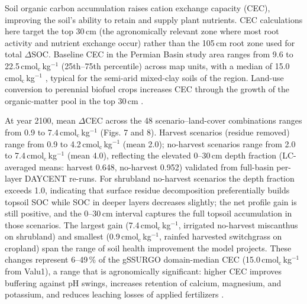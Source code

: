 \documentclass[11pt]{article}
\begin{document}
Soil organic carbon accumulation raises cation exchange capacity (CEC), improving the soil's ability to retain and supply plant nutrients. CEC calculations here target the top 30\,cm (the agronomically relevant zone where most root activity and nutrient exchange occur) rather than the 105\,cm root zone used for total $\Delta$SOC. Baseline CEC in the Permian Basin study area ranges from 9.6 to 22.5\,cmol$_\text{c}$\,kg$^{-1}$ (25th--75th percentile) across map units, with a median of 15.0\,cmol$_\text{c}$\,kg$^{-1}$ \citep{NRCSgSSURGOPlaceholder}, typical for the semi-arid mixed-clay soils of the region. Land-use conversion to perennial biofuel crops increases CEC through the growth of the organic-matter pool in the top 30\,cm \citep{BradyWeilSoilsPlaceholder}.

At year 2100, mean $\Delta$CEC across the 48 scenario--land-cover combinations ranges from 0.9 to 7.4\,cmol$_\text{c}$\,kg$^{-1}$ (Figs. 7 and 8). Harvest scenarios (residue removed) range from 0.9 to 4.2\,cmol$_\text{c}$\,kg$^{-1}$ (mean 2.0); no-harvest scenarios range from 2.0 to 7.4\,cmol$_\text{c}$\,kg$^{-1}$ (mean 4.0), reflecting the elevated 0--30\,cm depth fraction (LC-averaged means: harvest 0.648, no-harvest 0.952) validated from full-basin per-layer DAYCENT re-runs. For shrubland no-harvest scenarios the depth fraction exceeds 1.0, indicating that surface residue decomposition preferentially builds topsoil SOC while SOC in deeper layers decreases slightly; the net profile gain is still positive, and the 0--30\,cm interval captures the full topsoil accumulation in those scenarios. The largest gain (7.4\,cmol$_\text{c}$\,kg$^{-1}$, irrigated no-harvest miscanthus on shrubland) and smallest (0.9\,cmol$_\text{c}$\,kg$^{-1}$, rainfed harvested switchgrass on cropland) span the range of soil health improvement the model projects. These changes represent 6--49\,\% of the gSSURGO domain-median CEC (15.0\,cmol$_\text{c}$\,kg$^{-1}$ from Valu1), a range that is agronomically significant: higher CEC improves buffering against pH swings, increases retention of calcium, magnesium, and potassium, and reduces leaching losses of applied fertilizers \citep{BradyWeilSoilsPlaceholder}.
\end{document}
